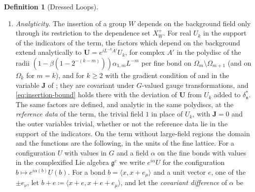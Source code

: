 \documentclass[11pt]{preprint}
\DeclarePairedDelimiter{\norm}{\lVert}{\rVert}
\numberwithin{equation}{section}
\theoremstyle{definition}
\newtheorem{definition}[theorem]{Definition}
\theoremstyle{remark}
\theoremstyle{plain}
\begin{document}
\begin{definition}[Dressed Loops]
\begin{enumerate}[label=(\roman*)]
\begin{equation}\label{eq:cross-bound}
\begin{gathered}
    \sum_We^{\theta(W) + \lambda_k(W)\nu\sigma(W)}\norm{Y_W} \leq 2^{k-j+1}\mathsf A^\times_j\;,\\
    \mathsf A^\times_j \coloneqq P_j(\mathcal C)\Bigl[C_{\mathrm{cr}}\mathfrak a_je^{-\nu_\times d_j/M} + \mathbf 1_{\mathbf R}(j)\,C^{\mathbf R}_{\mathrm{cr}}e^{-p_0(g_j)/4}e^{-\kappa d_j/(6MR_j)}\Bigr]\;,
\end{gathered}
\end{equation}
with rates $\lambda_k(W) \in [\frac{15}{16}, 1]$ and the decay rate $\kappa$ of Ba{\l}aban's polymers at the $\mathbf R$-steps (Supplement, Proposition~S.10), where $d_j$ is the least $\ell^\infty$-distance between two loops of the ensemble in units of the scale $j$, so that $d_j \geq a_j$ by Lemma~\ref{lem:stopping-index}, $\mathfrak a_j$ is the amplitude of Definition~\ref{def:amplitude}, and $\mathbf 1_{\mathbf R}(j)$ is $1$ at the steps at which the $\mathbf R$-operation acts and $0$ at the others; for a single loop the cross species is empty. A cross group one of whose parents is attached or wraps around the torus belongs to the species of the first such parent and satisfies the bounds of that species.
\item \emph{Analyticity.} The insertion of a group $W$ depends on the background field only through its restriction to the dependence set $X^+_W$. For real $U_k$ in the support of the indicators of the term, the factors which depend on the background extend analytically to $\mathbf U = e^{iL^{-k}A'}U_k$, for complex $A'$ in the polydisc of the radii $(1 - \beta(1 - 2^{-(k-m)}))\alpha_{1,m}L^{-m}$ per fine bond on $\Omega_m \setminus \Omega_{m+1}$ (and on $\Omega_k$ for $m = k$), and for $k \geq 2$ with the gradient condition of \cite[(2.39), p.~261]{BalabanCRE} and in the variable $\mathbf J$ of \cite[(2.36)]{BalabanCRE}; they are covariant under $G$-valued gauge transformations, and \eqref{eq:insertion-bound} holds there with the deviation of $\mathbf U$ from $U_k$ added to $\delta^{*}_{\mathfrak n}$. The same factors are defined, and analytic in the same polydiscs, at the \emph{reference data} of the term, the trivial field $1$ in place of $U_k$, with $\mathbf J = 0$ and the outer variables trivial, whether or not the reference data lie in the support of the indicators. On the term without large-field regions the domain and the functions are the following, in the units of the fine lattice. For a configuration $U$ with values in $G$ and a field $\alpha$ on the fine bonds with values in the complexified Lie algebra $\mathfrak g^c$ we write $e^{i\alpha}U$ for the configuration $b \mapsto e^{i\alpha(b)}U(b)$. For a bond $b = \langle x, x + e_\mu\rangle$ and a unit vector $e$, one of the $\pm e_\nu$, let $b + e \coloneqq \langle x + e, x + e + e_\mu\rangle$, and let the \emph{covariant difference} of $\alpha$ be

\end{enumerate}
\end{definition}
\end{document}
